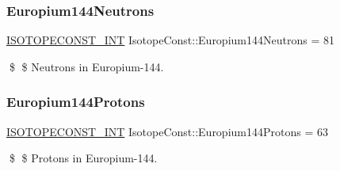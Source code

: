 \subsubsection{\texorpdfstring{Europium144\+Neutrons}{Europium144Neutrons}}
{\footnotesize\ttfamily \mbox{\hyperlink{group___isotope_const-_macros_ga5f18360b3e99483a35c32d789e62621c}{I\+S\+O\+T\+O\+P\+E\+C\+O\+N\+S\+T\+\_\+\+I\+NT}} Isotope\+Const\+::\+Europium144\+Neutrons = 81}

\$ \$ Neutrons in Europium-\/144. \mbox{\label{group___isotope_const-_europium-_eu144_ga25ffe582faeed2949e7448828fef0beb}} 
\subsubsection{\texorpdfstring{Europium144\+Protons}{Europium144Protons}}
{\footnotesize\ttfamily \mbox{\hyperlink{group___isotope_const-_macros_ga5f18360b3e99483a35c32d789e62621c}{I\+S\+O\+T\+O\+P\+E\+C\+O\+N\+S\+T\+\_\+\+I\+NT}} Isotope\+Const\+::\+Europium144\+Protons = 63}

\$ \$ Protons in Europium-\/144. 